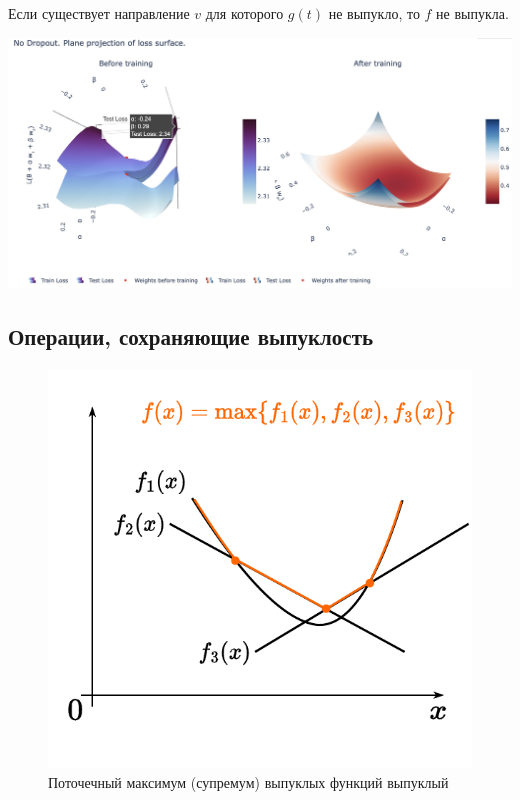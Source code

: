 \documentclass[
  russian,
  letterpaper,
  DIV=11,
  numbers=noendperiod]{scrartcl}
\begin{document}
Если существует направление \(v\) для которого \(g(t)\) не выпукло, то
\(f\) не выпукла. \begin{center}
\includegraphics[width=0.8\linewidth,height=\textheight,keepaspectratio]{plane_projection.jpeg}
\end{center}

\subsection{Операции, сохраняющие
выпуклость}\label{ux43eux43fux435ux440ux430ux446ux438ux438-ux441ux43eux445ux440ux430ux43dux44fux44eux449ux438ux435-ux432ux44bux43fux443ux43aux43bux43eux441ux442ux44c-1}

\begin{figure}[H]

{\centering \includegraphics[width=0.7\linewidth,height=\textheight,keepaspectratio]{pointwise_maximum.pdf}

}

\caption{Поточечный максимум (супремум) выпуклых функций выпуклый}

\end{figure}%
\end{document}
